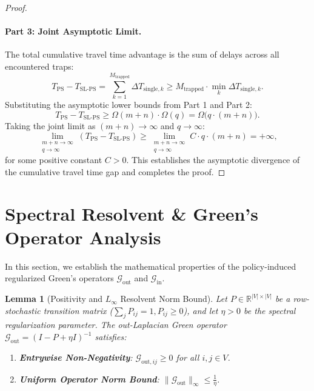 \documentclass[11pt,a4paper]{article}
\newtheorem{lemma}{Lemma}
\begin{document}
\begin{proof}
\paragraph{Part 3: Joint Asymptotic Limit.}
The total cumulative travel time advantage is the sum of delays across all encountered traps:
\begin{equation}
T_{\text{PS}} - T_{\text{SL-PS}} = \sum_{k=1}^{M_{\text{trapped}}} \Delta T_{\text{single}, k} \ge M_{\text{trapped}} \cdot \min_k \Delta T_{\text{single}, k}.
\end{equation}
Substituting the asymptotic lower bounds from Part 1 and Part 2:
\begin{equation}
T_{\text{PS}} - T_{\text{SL-PS}} \ge \Omega(m + n) \cdot \Omega(q) = \Omega\big(q \cdot (m + n)\big).
\end{equation}
Taking the joint limit as $(m + n) \to \infty$ and $q \to \infty$:
\begin{equation}
\lim_{\substack{m+n \to \infty \\ q \to \infty}} \left( T_{\text{PS}} - T_{\text{SL-PS}} \right) \ge \lim_{\substack{m+n \to \infty \\ q \to \infty}} C \cdot q \cdot (m + n) = +\infty,
\end{equation}
for some positive constant $C > 0$. This establishes the asymptotic divergence of the cumulative travel time gap and completes the proof.
\end{proof}

\section{Spectral Resolvent \& Green's Operator Analysis}
\label{sec:appendix_spectral}

In this section, we establish the mathematical properties of the policy-induced regularized Green's operators $\mathcal{G}_{\text{out}}$ and $\mathcal{G}_{\text{in}}$.

\begin{lemma}[Positivity and $L_\infty$ Resolvent Norm Bound]
\label{lem:green_norm}
Let $P \in \mathbb{R}^{|V| \times |V|}$ be a row-stochastic transition matrix ($\sum_j P_{ij} = 1, P_{ij} \ge 0$), and let $\eta > 0$ be the spectral regularization parameter. The out-Laplacian Green operator $\mathcal{G}_{\text{out}} = (I - P + \eta I)^{-1}$ satisfies:
\begin{enumerate}
    \item \textbf{Entrywise Non-Negativity}: $\mathcal{G}_{\text{out}, ij} \ge 0$ for all $i, j \in V$.
    \item \textbf{Uniform Operator Norm Bound}: $\|\mathcal{G}_{\text{out}}\|_\infty \le \frac{1}{\eta}$.
\end{enumerate}
\end{lemma}
\end{document}
